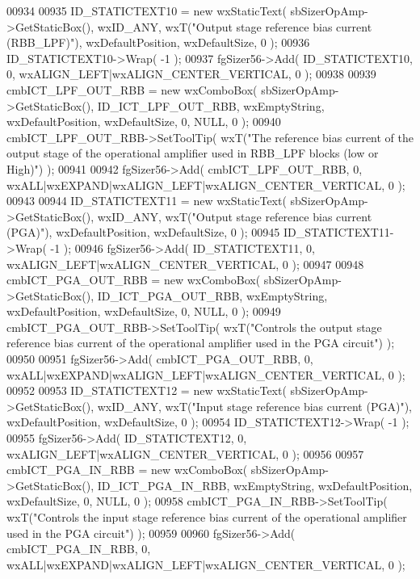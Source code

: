 \begin{DoxyCode}
00934     
00935     ID_STATICTEXT10 = \textcolor{keyword}{new} wxStaticText( sbSizerOpAmp->GetStaticBox(), wxID\_ANY, wxT(\textcolor{stringliteral}{"Output stage reference
       bias current (RBB\_LPF)"}), wxDefaultPosition, wxDefaultSize, 0 );
00936     ID_STATICTEXT10->Wrap( -1 );
00937     fgSizer56->Add( ID_STATICTEXT10, 0, wxALIGN\_LEFT|wxALIGN\_CENTER\_VERTICAL, 0 );
00938     
00939     cmbICT_LPF_OUT_RBB = \textcolor{keyword}{new} wxComboBox( sbSizerOpAmp->GetStaticBox(), 
      ID_ICT_LPF_OUT_RBB, wxEmptyString, wxDefaultPosition, wxDefaultSize, 0, NULL, 0 ); 
00940     cmbICT_LPF_OUT_RBB->SetToolTip( wxT(\textcolor{stringliteral}{"The reference bias current of the output stage of the operational
       amplifier used in RBB\_LPF blocks (low or High)"}) );
00941     
00942     fgSizer56->Add( cmbICT_LPF_OUT_RBB, 0, wxALL|wxEXPAND|wxALIGN\_LEFT|wxALIGN\_CENTER\_VERTICAL, 0 );
00943     
00944     ID_STATICTEXT11 = \textcolor{keyword}{new} wxStaticText( sbSizerOpAmp->GetStaticBox(), wxID\_ANY, wxT(\textcolor{stringliteral}{"Output stage reference
       bias current (PGA)"}), wxDefaultPosition, wxDefaultSize, 0 );
00945     ID_STATICTEXT11->Wrap( -1 );
00946     fgSizer56->Add( ID_STATICTEXT11, 0, wxALIGN\_LEFT|wxALIGN\_CENTER\_VERTICAL, 0 );
00947     
00948     cmbICT_PGA_OUT_RBB = \textcolor{keyword}{new} wxComboBox( sbSizerOpAmp->GetStaticBox(), 
      ID_ICT_PGA_OUT_RBB, wxEmptyString, wxDefaultPosition, wxDefaultSize, 0, NULL, 0 ); 
00949     cmbICT_PGA_OUT_RBB->SetToolTip( wxT(\textcolor{stringliteral}{"Controls the output stage reference bias current of the
       operational amplifier used in the PGA circuit"}) );
00950     
00951     fgSizer56->Add( cmbICT_PGA_OUT_RBB, 0, wxALL|wxEXPAND|wxALIGN\_LEFT|wxALIGN\_CENTER\_VERTICAL, 0 );
00952     
00953     ID_STATICTEXT12 = \textcolor{keyword}{new} wxStaticText( sbSizerOpAmp->GetStaticBox(), wxID\_ANY, wxT(\textcolor{stringliteral}{"Input stage reference
       bias current (PGA)"}), wxDefaultPosition, wxDefaultSize, 0 );
00954     ID_STATICTEXT12->Wrap( -1 );
00955     fgSizer56->Add( ID_STATICTEXT12, 0, wxALIGN\_LEFT|wxALIGN\_CENTER\_VERTICAL, 0 );
00956     
00957     cmbICT_PGA_IN_RBB = \textcolor{keyword}{new} wxComboBox( sbSizerOpAmp->GetStaticBox(), 
      ID_ICT_PGA_IN_RBB, wxEmptyString, wxDefaultPosition, wxDefaultSize, 0, NULL, 0 ); 
00958     cmbICT_PGA_IN_RBB->SetToolTip( wxT(\textcolor{stringliteral}{"Controls the input stage reference bias current of the operational
       amplifier used in the PGA circuit"}) );
00959     
00960     fgSizer56->Add( cmbICT_PGA_IN_RBB, 0, wxALL|wxEXPAND|wxALIGN\_LEFT|wxALIGN\_CENTER\_VERTICAL, 0 );

\end{DoxyCode}
